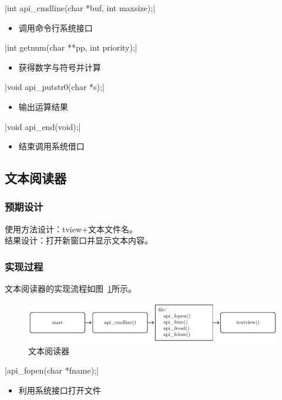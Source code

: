         \csingle|int api_cmdline(char *buf, int maxsize);|
        \begin{itemize}
        \item 调用命令行系统接口
        \end{itemize}

        \csingle|int getnum(char **pp, int priority);|
        \begin{itemize}
        \item 获得数字与符号并计算
        \end{itemize}

        \csingle|void api_putstr0(char *s);|
        \begin{itemize}
        \item 输出运算结果
        \end{itemize}

        \csingle|void api_end(void);|
        \begin{itemize}
        \item 结束调用系统借口
        \end{itemize}

\subsection{文本阅读器}

    \subsubsection{预期设计}
        使用方法设计：tview+文本文件名。 \\
        结果设计：打开新窗口并显示文本内容。
    \subsubsection{实现过程}
    文本阅读器的实现流程如图~\ref{fig:tview}所示。

      \begin{figure}[H]
        \centering
        \includegraphics[width=\textwidth]{../Fig/api/tview.pdf}
        \caption{文本阅读器}
        \label{fig:tview}
      \end{figure}

    \csingle|api_fopen(char *fname);|
    \begin{itemize}
    \item 利用系统接口打开文件
    \end{itemize}
    
